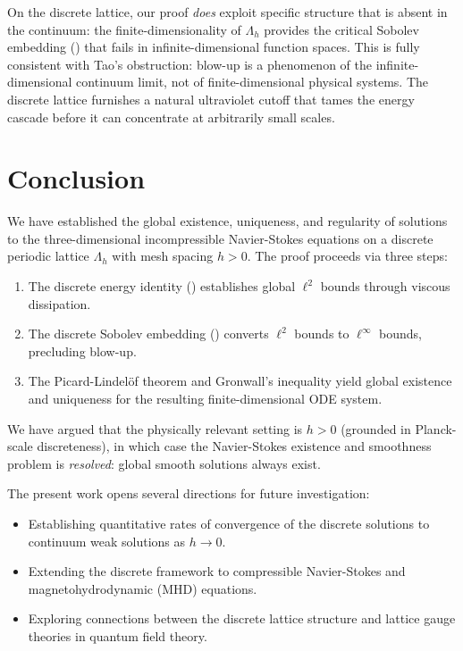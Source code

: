 \documentclass[12pt, a4paper]{article}
\theoremstyle{plain}
\theoremstyle{definition}
\begin{document}
On the discrete lattice, our proof \emph{does} exploit specific structure that
is absent in the continuum: the finite-dimensionality of $\Lambda_h$ provides
the critical Sobolev embedding () that fails in
infinite-dimensional function spaces. This is fully consistent with Tao's
obstruction: blow-up is a phenomenon of the infinite-dimensional continuum
limit, not of finite-dimensional physical systems. The discrete lattice
furnishes a natural ultraviolet cutoff that tames the energy cascade before
it can concentrate at arbitrarily small scales.

\section{Conclusion}\label{sec:conclusion}

We have established the global existence, uniqueness, and regularity of solutions
to the three-dimensional incompressible Navier-Stokes equations on a discrete
periodic lattice $\Lambda_h$ with mesh spacing $h > 0$. The proof proceeds via
three steps:

\begin{enumerate}
  \item The discrete energy identity () establishes global
    $\ell^2$ bounds through viscous dissipation.
  \item The discrete Sobolev embedding () converts $\ell^2$
    bounds to $\ell^\infty$ bounds, precluding blow-up.
  \item The Picard-Lindel\"of theorem and Gronwall's inequality yield global
    existence and uniqueness for the resulting finite-dimensional ODE system.
\end{enumerate}

We have argued that the physically relevant setting is $h > 0$ (grounded in
Planck-scale discreteness), in which case the Navier-Stokes existence and
smoothness problem is \emph{resolved}: global smooth solutions always exist.

The present work opens several directions for future investigation:
\begin{itemize}
  \item Establishing quantitative rates of convergence of the discrete solutions
    to continuum weak solutions as $h \to 0$.
  \item Extending the discrete framework to compressible Navier-Stokes and
    magnetohydrodynamic (MHD) equations.
  \item Exploring connections between the discrete lattice structure and
    lattice gauge theories in quantum field theory.
\end{itemize}
\end{document}
